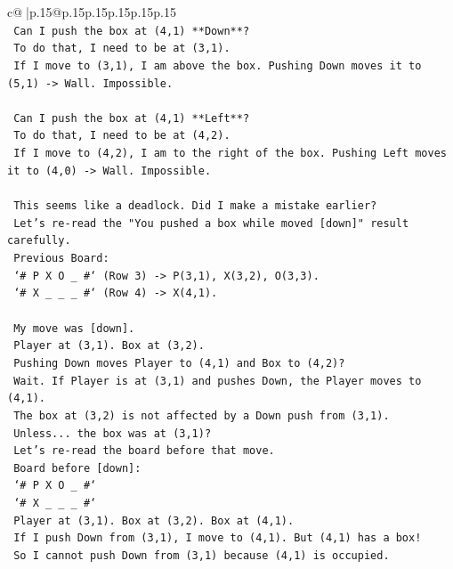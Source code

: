 \documentclass{article}
\begin{document}
{\begin{supertabular}{c@{$\;$}|p{.15\linewidth}@{}p{.15\linewidth}p{.15\linewidth}p{.15\linewidth}p{.15\linewidth}p{.15\linewidth}}
{{{\\ 
\texttt{      Can I push the box at (4,1) **Down**?} \\
\texttt{      To do that, I need to be at (3,1).} \\
\texttt{      If I move to (3,1), I am above the box. Pushing Down moves it to (5,1) {-}> Wall. Impossible.} \\
\\ 
\texttt{      Can I push the box at (4,1) **Left**?} \\
\texttt{      To do that, I need to be at (4,2).} \\
\texttt{      If I move to (4,2), I am to the right of the box. Pushing Left moves it to (4,0) {-}> Wall. Impossible.} \\
\\ 
\texttt{      This seems like a deadlock. Did I make a mistake earlier?} \\
\texttt{      Let's re{-}read the "You pushed a box while moved {[}down{]}" result carefully.} \\
\texttt{      Previous Board:} \\
\texttt{      `\# P X O \_ \#` (Row 3) {-}> P(3,1), X(3,2), O(3,3).} \\
\texttt{      `\# X \_ \_ \_ \#` (Row 4) {-}> X(4,1).} \\
\\ 
\texttt{      My move was {[}down{]}.} \\
\texttt{      Player at (3,1). Box at (3,2).} \\
\texttt{      Pushing Down moves Player to (4,1) and Box to (4,2)?} \\
\texttt{      Wait. If Player is at (3,1) and pushes Down, the Player moves to (4,1).} \\
\texttt{      The box at (3,2) is not affected by a Down push from (3,1).} \\
\texttt{      Unless... the box was at (3,1)?} \\
\texttt{      Let's re{-}read the board before that move.} \\
\texttt{      Board before {[}down{]}:} \\
\texttt{      `\# P X O \_ \#`} \\
\texttt{      `\# X \_ \_ \_ \#`} \\
\texttt{      Player at (3,1). Box at (3,2). Box at (4,1).} \\
\texttt{      If I push Down from (3,1), I move to (4,1). But (4,1) has a box!} \\
\texttt{      So I cannot push Down from (3,1) because (4,1) is occupied.} \\
}}}
\end{supertabular}}
\end{document}
